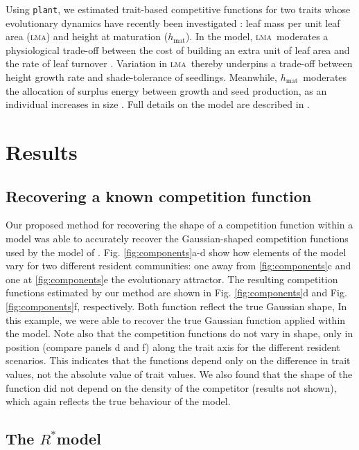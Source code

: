 \documentclass[a4paper,11pt]{article}
\newcommand{\Rstar}{\ensuremath{R^*}}
\newcommand{\plant}{{\tt plant}}
\newcommand{\hmat}{\ensuremath{h_{\text{mat}}}}
\newcommand{\lma}{\textsc{lma}}
\begin{document}
Using \plant, we estimated trait-based competitive functions for two traits whose evolutionary dynamics have recently been investigated \citep{Falster-2017}: leaf mass per unit leaf area (\lma) and height at maturation (\hmat). In the model, \lma\ moderates a physiological trade-off between the cost of building an extra unit of leaf area and the rate of leaf turnover \citep{Wright-2004}. Variation in \lma\ thereby underpins a trade-off between height growth rate and shade-tolerance of seedlings. Meanwhile, \hmat\ moderates the allocation of surplus energy between growth and seed production, as an individual increases in size \citep{Falster-2017}. Full details on the model are described in \citet{Falster-2016, Falster-2017}.

\section{Results}

\subsection{Recovering a known competition function}

Our proposed method for recovering the shape of a competition function within a model was able to accurately recover the Gaussian-shaped competition functions used by the model of \citet{Dieckmann-1999}. Fig. \ref{fig:components}a-d show how elements of the model vary for two different resident communities: one away from \ref{fig:components}c and one at \ref{fig:components}e the evolutionary attractor. The resulting competition functions estimated by our method are shown in Fig. \ref{fig:components}d and Fig. \ref{fig:components}f, respectively. Both function reflect the true Gaussian shape, In this example, we were able to recover the true Gaussian function applied within the model. Note also that the competition functions do not vary in shape, only in position (compare panels d and f) along the trait axis for the different resident scenarios. This indicates that the functions depend only on the difference in trait values, not the absolute value of trait values. We also found that the shape of the function did not depend on the density of the competitor (results not shown), which again reflects the true behaviour of the model.

\subsection{The \Rstar model}
\end{document}
